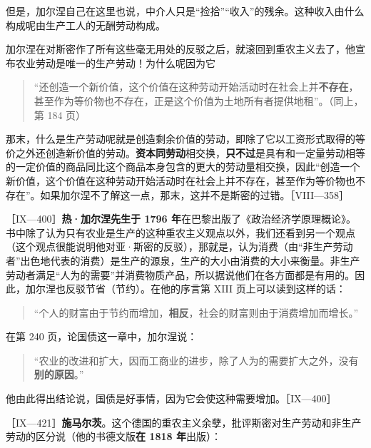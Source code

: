 但是，加尔涅自己在这里也说，中介人只是“捡拾”“收入”的残余。这种收入由什么构成呢由生产工人的无酬劳动构成。

加尔涅在对斯密作了所有这些毫无用处的反驳之后，就滚回到重农主义去了，他宣布农业劳动是唯一的生产劳动！为什么呢因为它

\begin{quote}“还创造一个新价值，这个价值在这种劳动开始活动时在社会上并\textbf{不存在}，甚至作为等价物也不存在，正是这个价值为土地所有者提供地租”。（同上，第 184 页）\end{quote}

那末，什么是生产劳动呢就是创造剩余价值的劳动，即除了它以工资形式取得的等价之外还创造新价值的劳动。\textbf{资本同劳动}相交换，\textbf{只不过}是具有和一定量劳动相等的一定价值的商品同比这个商品本身包含的更大的劳动量相交换，因此“创造一个新价值，这个价值在这种劳动开始活动时在社会上并不存在，甚至作为等价物也不存在”。如果加尔涅不了解这一点，那末，这并不是斯密的过错。［VIII—358］


［IX—400］\textbf{热·加尔涅先生于 1796 年}在巴黎出版了《政治经济学原理概论》。书中除了认为只有农业是生产的这种重农主义观点以外，我们还看到另一个观点（这个观点很能说明他对亚·斯密的反驳），那就是，认为消费（由“非生产劳动者”出色地代表的消费）是生产的源泉，生产的大小由消费的大小来衡量。非生产劳动者满足“人为的需要”并消费物质产品，所以据说他们在各方面都是有用的。因此，加尔涅也反驳节省（节约）。在他的序言第 XIII 页上可以读到这样的话：

\begin{quote}“个人的财富由于节约而增加，\textbf{相反}，社会的财富则由于消费增加而增长。”\end{quote}

在第 240 页，论国债这一章中，加尔涅说：

\begin{quote}“农业的改进和扩大，因而工商业的进步，除了人为的需要扩大之外，没有\textbf{别的原因}。”\end{quote}

他由此得出结论说，国债是好事情，因为它会使这种需要增加。［IX—400］


［IX—421］\textbf{施马尔茨}。这个德国的重农主义余孽，批评斯密对生产劳动和非生产劳动的区分说（他的书德文版\textbf{在 1818 年}出版）：

